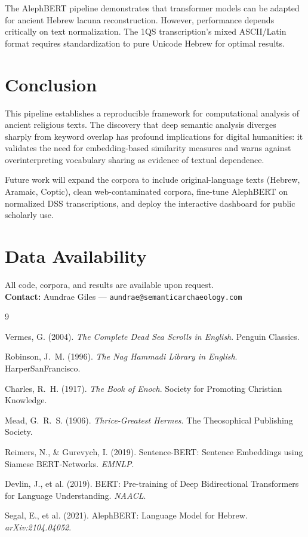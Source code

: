 \documentclass[11pt]{article}
\begin{document}
The AlephBERT pipeline demonstrates that transformer models can be adapted for ancient Hebrew lacuna reconstruction. However, performance depends critically on text normalization. The 1QS transcription's mixed ASCII/Latin format requires standardization to pure Unicode Hebrew for optimal results.

\section{Conclusion}

This pipeline establishes a reproducible framework for computational analysis of ancient religious texts. The discovery that deep semantic analysis diverges sharply from keyword overlap has profound implications for digital humanities: it validates the need for embedding-based similarity measures and warns against overinterpreting vocabulary sharing as evidence of textual dependence.

Future work will expand the corpora to include original-language texts (Hebrew, Aramaic, Coptic), clean web-contaminated corpora, fine-tune AlephBERT on normalized DSS transcriptions, and deploy the interactive dashboard for public scholarly use.

\section*{Data Availability}

All code, corpora, and results are available upon request.\\
\textbf{Contact:} Aundrae Giles --- \texttt{aundrae@semanticarchaeology.com}

\begin{thebibliography}{9}

Vermes, G. (2004). \textit{The Complete Dead Sea Scrolls in English}. Penguin Classics.

Robinson, J.~M. (1996). \textit{The Nag Hammadi Library in English}. HarperSanFrancisco.

Charles, R.~H. (1917). \textit{The Book of Enoch}. Society for Promoting Christian Knowledge.

Mead, G.~R.~S. (1906). \textit{Thrice-Greatest Hermes}. The Theosophical Publishing Society.

Reimers, N., \& Gurevych, I. (2019). Sentence-BERT: Sentence Embeddings using Siamese BERT-Networks. \textit{EMNLP}.

Devlin, J., et al. (2019). BERT: Pre-training of Deep Bidirectional Transformers for Language Understanding. \textit{NAACL}.

Segal, E., et al. (2021). AlephBERT: Language Model for Hebrew. \textit{arXiv:2104.04052}.

\end{thebibliography}
\end{document}
